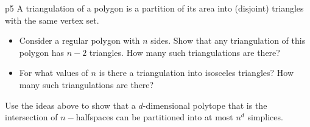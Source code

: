 \documentclass[a4paper, 11pt]{article}
\begin{document}

\begin{problem}{%
}{p5%
}
A triangulation of a polygon is a partition of its area into (disjoint) triangles with the same vertex set. \begin{itemize}[label=$\bullet$]
	\item Consider a regular polygon with $n$ sides. Show that any triangulation of this polygon has $n-2$ triangles. How many such triangulations are there?
	\item For what values of $n$ is there a triangulation into isosceles triangles? How many such triangulations are there?
\end{itemize}
Use the ideas above to show that a $d$-dimensional polytope that is the intersection of $n-$halfspaces can be partitioned into at most $n^d$ simplices.
\end{problem}
\solve{
}
\end{document}
